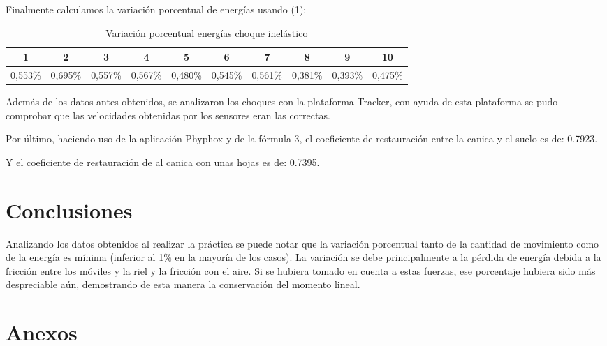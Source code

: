 \documentclass[a4paper]{article}
\begin{document}
Finalmente calculamos la variación porcentual de energías usando (1): 
\begin{table}[H]
    \centering
    \begin{tabular}{|c|c|c|c|c|c|c|c|c|c|}
    \hline
        1 & 2 & 3 & 4 & 5 & 6 & 7 & 8 & 9 & 10 \\ \hline
        0,553\%  & 0,695\%  & 0,557\%  & 0,567\%  & 0,480\%  & 0,545\%  & 0,561\%  & 0,381\%  & 0,393\%  & 0,475\%  \\ \hline
    \end{tabular}
    \caption{Variación porcentual energías choque inelástico}
\end{table}

Además de los datos antes obtenidos, se analizaron los choques con la plataforma Tracker, con ayuda de esta plataforma se pudo comprobar que las velocidades obtenidas por los sensores eran las correctas. 

Por último, haciendo uso de la aplicación Phyphox y de la fórmula 3, el coeficiente de restauración entre la canica y el suelo es de: 0.7923.

Y el coeficiente de restauración de al canica con unas hojas es de: 0.7395.

\section{Conclusiones}
Analizando los datos obtenidos al realizar la práctica se puede notar que la variación porcentual tanto de la cantidad de movimiento como de la energía es mínima (inferior al 1$\%$ en la mayoría de los casos). La variación se debe principalmente a la pérdida de energía debida a la fricción entre los móviles y la riel y la fricción con el aire. Si se hubiera tomado en cuenta a estas fuerzas, ese porcentaje hubiera sido más despreciable aún, demostrando de esta manera la conservación del momento lineal.

\section{Anexos}
\end{document}
